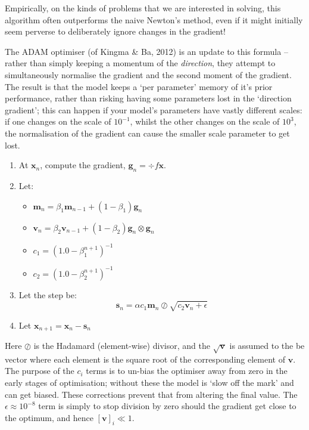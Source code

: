 \documentclass[a4paper,openany,11pt]{book}
\renewcommand\vec[1]{\boldsymbol{\mathbf{#1}}}
\begin{document}
				Empirically, on the kinds of problems that we are interested in solving, this algorithm often outperforms the naive Newton's method, even if it might initially seem perverse to deliberately ignore changes in the gradient!
	
				The ADAM optimiser (of Kingma \& Ba, 2012) is an update to this formula -- rather than simply keeping a momentum of the \textit{direction}, they attempt to simultaneously normalise the gradient and the second moment of the gradient. The result is that the model keeps a `per parameter' memory of it's prior performance, rather than risking having some parameters lost in the `direction gradient'; this can happen if your model's parameters have vastly different scales: if one changes on the scale of $10^{-1}$, whilst the other changes on the scale of $10^3$, the normalisation of the gradient can cause the smaller scale parameter to get lost. 
				
				\begin{enumerate}
					\item At $\vec{x}_n$, compute the gradient, $\vec{g}_n = \div{f}{\vec{x}}$. 
					\item Let:
					\begin{itemize}
						\item $\vec{m}_n = \beta_1 \vec{m}_{n-1} + (1 -\beta_1) \vec{g}_n$
						\item $\vec{v}_n = \beta_2 \vec{v}_{n-1} + (1 - \beta_2) \vec{g}_n \otimes \vec{g}_n$
						\item $c_1 = \left(1.0 - \beta_1^{n+1}\right)^{-1}$
						\item $c_2 = \left(1.0 - \beta_2^{n+1}\right)^{-1}$
					\end{itemize}
	
					\item Let the step be: $$\vec{s}_n = \alpha c_1 \vec{m}_n \oslash \sqrt{c_2 \vec{v}_n + \epsilon}$$
					\item Let $\vec{x}_{n+1} = \vec{x}_n - \vec{s}_n$
				\end{enumerate}
				Here $\oslash$ is the Hadamard (element-wise) divisor, and the $\sqrt{\vec{v}}$ is assumed to the be vector where each element is the square root of the corresponding element of $\vec{v}$. The purpose of the $c_i$ terms is to un-bias the optimiser away from zero in the early stages of optimisation; without these the model is `slow off the mark' and can get biased. These corrections prevent that from altering the final value. The $\epsilon \approx 10^{-8}$ term is simply to stop division by zero should the gradient get close to the optimum, and hence $[\vec{v}]_i \ll 1$.
	
\end{document}
